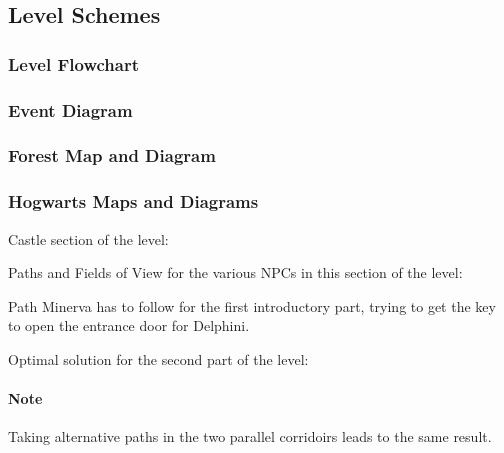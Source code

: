 \pagebreak

\subsection{Level Schemes}

\subsubsection{Level Flowchart}

\subsubsection{Event Diagram}

\subsubsection{Forest Map and Diagram}

\pagebreak

\subsubsection{Hogwarts Maps and Diagrams}

Castle section of the level:

\pagebreak
Paths and Fields of View for the various NPCs in this section of the level:

\pagebreak
Path Minerva has to follow for the first introductory part, trying to get the key to open the entrance door for Delphini.

\pagebreak
Optimal solution for the second part of the level:

\pagebreak
\paragraph{Note} Taking alternative paths in the two parallel corridoirs leads to the same result.

